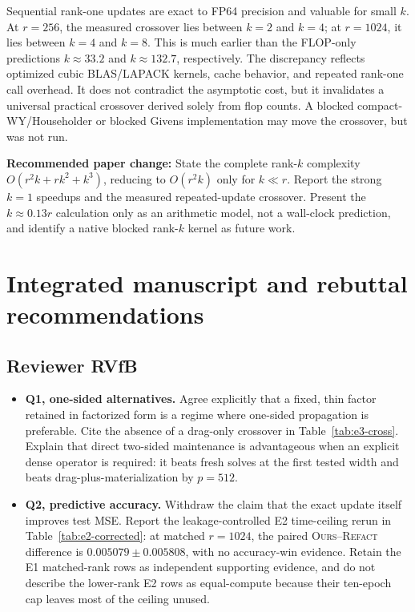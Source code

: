 \documentclass[11pt]{article}
\newcommand{\ours}{\textsc{Ours}}
\newcommand{\refact}{\textsc{Refact}}
\newcommand{\paperchange}[1]{\textbf{Recommended paper change:} #1}
\begin{document}
Sequential rank-one updates are exact to FP64 precision and valuable for small
\(k\).  At \(r=256\), the measured crossover lies between \(k=2\) and \(k=4\);
at \(r=1024\), it lies between \(k=4\) and \(k=8\).  This is much earlier than
the FLOP-only predictions \(k\approx33.2\) and \(k\approx132.7\),
respectively.  The discrepancy reflects optimized cubic BLAS/LAPACK kernels,
cache behavior, and repeated rank-one call overhead.  It does not contradict
the asymptotic cost, but it invalidates a universal practical crossover
derived solely from flop counts.  A blocked compact-WY/Householder or blocked
Givens implementation may move the crossover, but was not run.

\paperchange{State the complete rank-\(k\) complexity
\(O(r^2k+rk^2+k^3)\), reducing to \(O(r^2k)\) only for \(k\ll r\).  Report
the strong \(k=1\) speedups and the measured repeated-update crossover.
Present the \(k\approx0.13r\) calculation only as an arithmetic model, not a
wall-clock prediction, and identify a native blocked rank-\(k\) kernel as
future work.}

\section{Integrated manuscript and rebuttal recommendations}
\label{sec:recommendations}

\subsection{Reviewer RVfB}

\begin{itemize}
  \item \textbf{Q1, one-sided alternatives.} Agree explicitly that a fixed,
  thin factor retained in factorized form is a regime where one-sided
  propagation is preferable.  Cite the absence of a drag-only crossover in
  Table~\ref{tab:e3-cross}.  Explain that direct two-sided maintenance is
  advantageous when an explicit dense operator is required: it beats fresh
  solves at the first tested width and beats drag-plus-materialization by
  \(p=512\).
  \item \textbf{Q2, predictive accuracy.} Withdraw the claim that the exact
  update itself improves test MSE.  Report the leakage-controlled E2
  time-ceiling rerun in Table~\ref{tab:e2-corrected}: at matched
  \(r=1024\), the paired \ours{}--\refact{} difference is
  \(0.005079\pm0.005808\), with no accuracy-win evidence.  Retain the E1
  matched-rank rows as independent supporting evidence, and do not describe
  the lower-rank E2 rows as equal-compute because their ten-epoch cap leaves
  most of the ceiling unused.
\end{itemize}
\end{document}
